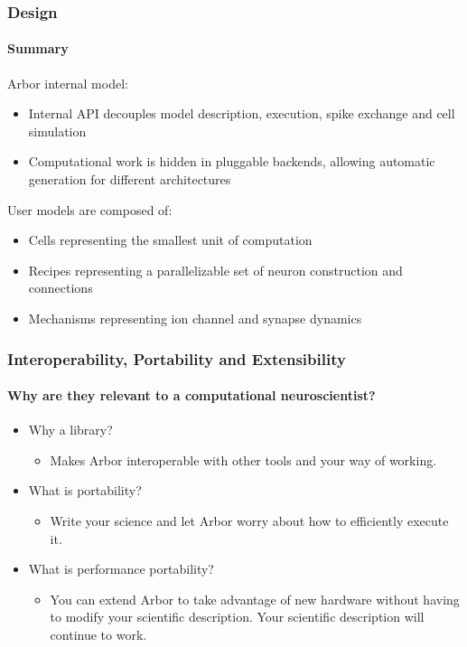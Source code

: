 \documentclass[t]{beamer}
\begin{document}
\begin{frame}
    \frametitle{Design}
    \framesubtitle{Summary}

    Arbor internal model:
    \begin{itemize}
    \item Internal API decouples model description, execution, spike exchange and cell simulation
    \item Computational work is hidden in pluggable backends, allowing automatic generation for different
architectures
    \end{itemize}

    User models are composed of:
    \begin{itemize}
    \item Cells representing the smallest unit of computation
    \item Recipes representing a parallelizable set of neuron construction and connections
    \item Mechanisms representing ion channel and synapse dynamics
    \end{itemize}
\end{frame}

\begin{frame}
    \frametitle{Interoperability, Portability and Extensibility}
    \framesubtitle{Why are they relevant to a computational neuroscientist?}
    \begin{itemize}
    \item Why a library?
    \begin{itemize}
    \item Makes Arbor interoperable with other tools and your way of working.
    \end{itemize}
    \item What is portability?
    \begin{itemize}
    \item Write your science and let Arbor worry about how to efficiently execute it.
    \end{itemize}
    \item What is performance portability?
    \begin{itemize}
    \item You can extend Arbor to take advantage of new hardware without having to modify your scientific description. Your scientific description will continue to work.
    \end{itemize}
    \end{itemize}
\end{frame}
\end{document}
